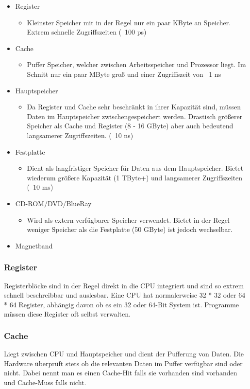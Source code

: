 \documentclass{article}
\begin{document}
	 \begin{itemize}
	 	\item{Register}
	 	\begin{itemize}
	 		\item{Kleinster Speicher mit in der Regel nur ein paar KByte an Speicher. Extrem schnelle Zugriffszeiten (~{}100 ps)}
	 	\end{itemize}
	 	\item{Cache}
	 	\begin{itemize}
	 		\item{Puffer Speicher, welcher zwischen Arbeitsspeicher und Prozessor liegt. Im Schnitt nur ein paar MByte groß und einer Zugriffszeit von ~{}1 ns}
	 	\end{itemize}
	 	\item{Hauptspeicher}
	 	\begin{itemize}
	 		\item{Da Register und Cache sehr beschränkt in ihrer Kapazität sind, müssen Daten im Hauptspeicher zwischengespeichert werden. Drastisch größerer Speicher als Cache und Register (8 - 16 GByte) aber auch bedeutend langsamerer Zugriffszeiten. (~{}10 ns)}
	 	\end{itemize}
	 	\item{Festplatte}
	 	\begin{itemize}
	 		\item{Dient als langfristiger Speicher für Daten aus dem Hauptspeicher. Bietet wiederum größere Kapazität (1 TByte+) und langsamerer Zugriffszeiten (~{}10 ms)}
	 	\end{itemize}
	 	\item{CD-ROM/DVD/BlueRay}
	 	\begin{itemize}
	 		\item{Wird als extern verfügbarer Speicher verwendet. Bietet in der Regel weniger Speicher als die Festplatte (50 GByte) ist jedoch wechselbar.}
	 	\end{itemize}
	 	\item{Magnetband}
	 \end{itemize}
	 \subsubsection{Register}
	 Registerblöcke sind in der Regel direkt in die CPU integriert und sind so extrem schnell beschreibbar und auslesbar. Eine CPU hat normalerweise 32 * 32 oder 64 * 64 Register, abhängig davon ob es ein 32 oder 64-Bit System ist. Programme müssen diese Register oft selbst verwalten.
	 \subsubsection{Cache}
	 Liegt zwischen CPU und Hauptspeicher und dient der Pufferung von Daten. Die Hardware überprüft stets ob die relevanten Daten im Puffer verfügbar sind oder nicht. Dabei nennt man es einen Cache-Hit falls sie vorhanden sind vorhanden und Cache-Muss falls nicht.
\end{document}
